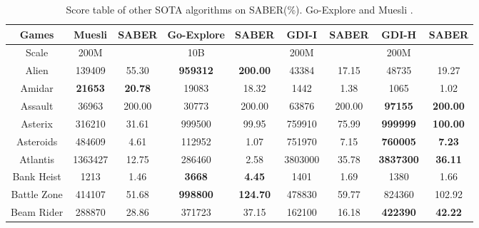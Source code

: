 \documentclass[nohyperref]{article}
\theoremstyle{plain}
\begin{document}
\begin{table}[!hb]
\footnotesize
\begin{center}
\caption{Score table of other SOTA  algorithms on SABER(\%). Go-Explore \citep{goexplore} and Muesli \citep{muesli}.}
\label{tab: Score table of other SOTA  algorithms on SABER.}
\setlength{\tabcolsep}{1.0pt}
\begin{tabular}{| c | c c |  c c| c c| c c|}
\hline
 Games           & Muesli              & SABER          & Go-Explore              & SABER                     & GDI-I & SABER        & GDI-H & SABER         \\
\hline
Scale            & 200M           &           & 10B                     &                             & 200M      &        & 200M      &           \\
\hline    
 Alien           &139409          &55.30               &\textbf{959312}       &\textbf{200.00}                & 43384             &17.15     &48735             &19.27         \\
 Amidar          &\textbf{21653}  &\textbf{20.78}      &19083                 &18.32                          & 1442              &1.38      &1065              &1.02          \\
 Assault         &36963           &200.00              &30773                 &200.00                         & 63876             &200.00  &\textbf{97155}&\textbf{200.00}        \\
 Asterix         &316210          &31.61               &999500       &99.95                 & 759910            &75.99      &\textbf{999999}            &\textbf{100.00}     \\
 Asteroids       &484609          &4.61                &112952                &1.07                           & 751970     &7.15&\textbf{760005}            &\textbf{7.23}           \\
 Atlantis        &1363427         &12.75               &286460                &2.58                           & 3803000    &35.78&\textbf{3837300}           &\textbf{36.11}          \\
 Bank Heist      &1213            &1.46                &\textbf{3668}         &\textbf{4.45  }                & 1401              &1.69        &1380              &1.66      \\
 Battle Zone     &414107          &51.68               &\textbf{998800}       &\textbf{124.70}                & 478830            &59.77       &824360            &102.92      \\
 Beam Rider      &288870          &28.86               &371723       &37.15                 & 162100            &16.18       &\textbf{422390}            &\textbf{42.22}      \\

\end{tabular}
\end{center}
\end{table}
\end{document}
